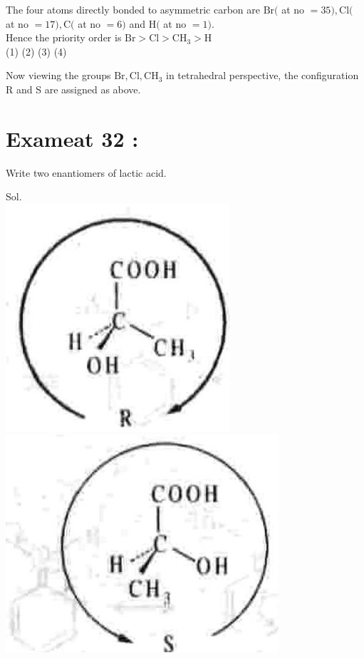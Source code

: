 \documentclass[10pt]{article}
\begin{document}
The four atoms directly bonded to asymmetric carbon are $\mathrm{Br}($ at no $=35), \mathrm{Cl}($ at no $=17), \mathrm{C}($ at no $=6)$ and $\mathrm{H}($ at no $=1)$.\\
Hence the priority order is $\mathrm{Br}>\mathrm{Cl}>\mathrm{CH}_{3}>\mathrm{H}$\\
(1) (2) (3) (4)

Now viewing the groups $\mathrm{Br}, \mathrm{Cl}, \mathrm{CH}_{3}$ in tetrahedral perspective, the configuration R and S are assigned as above.

\section*{Exameat 32 :}
Write two enantiomers of lactic acid.

Sol.\\
\includegraphics[max width=\textwidth, center]{2025_01_28_8470952b98110cec3aabg-125}\\
\includegraphics[max width=\textwidth, center]{2025_01_28_8470952b98110cec3aabg-125(2)}
\end{document}
